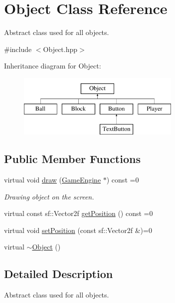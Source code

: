 \hypertarget{class_object}{}\section{Object Class Reference}
\label{class_object}


Abstract class used for all objects.  




{\ttfamily \#include $<$Object.\+hpp$>$}

Inheritance diagram for Object\+:\begin{figure}[H]
\begin{center}
\leavevmode
\includegraphics[height=3.000000cm]{class_object}
\end{center}
\end{figure}
\subsection*{Public Member Functions}
\begin{DoxyCompactItemize}
\item 
virtual void \mbox{\hyperlink{class_object_af9862406dcd271bd45580737df468af4}{draw}} (\mbox{\hyperlink{class_game_engine}{Game\+Engine}} $\ast$) const =0
\begin{DoxyCompactList}\small\item\em Drawing object on the screen. \end{DoxyCompactList}\item 
virtual const sf\+::\+Vector2f \mbox{\hyperlink{class_object_a3fd6370b8cfc53e5e41d09704726c2d4}{get\+Position}} () const =0
\item 
virtual void \mbox{\hyperlink{class_object_ac5c796bfa75dedf6d3bfc74685b2b77d}{set\+Position}} (const sf\+::\+Vector2f \&)=0
\item 
virtual \mbox{\hyperlink{class_object_aa3e791419d84c4c346ef9499513b8e00}{$\sim$\+Object}} ()
\end{DoxyCompactItemize}


\subsection{Detailed Description}
Abstract class used for all objects. 

